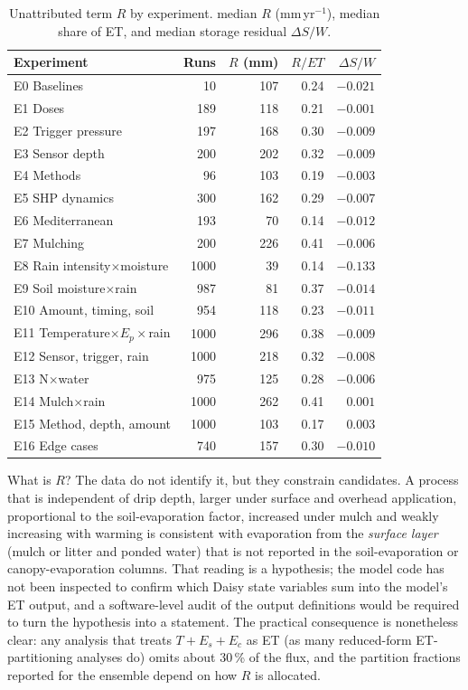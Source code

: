 \documentclass[preprint,12pt,authoryear]{elsarticle}
\begin{document}
\begin{table}[H]\centering\small
\caption{Unattributed term $R$ by experiment. median $R$ (mm\,yr$^{-1}$), median share of ET, and median storage residual $\Delta S/W$.}
\label{tab:R}
\begin{tabular}{lrrrr}
\toprule
Experiment & Runs & $R$ (mm) & $R/\mathit{ET}$ & $\Delta S/W$\\\midrule
E0 Baselines & 10 & 107 & 0.24 & $-0.021$\\
E1 Doses & 189 & 118 & 0.21 & $-0.001$\\
E2 Trigger pressure & 197 & 168 & 0.30 & $-0.009$\\
E3 Sensor depth & 200 & 202 & 0.32 & $-0.009$\\
E4 Methods & 96 & 103 & 0.19 & $-0.003$\\
E5 SHP dynamics & 300 & 162 & 0.29 & $-0.007$\\
E6 Mediterranean & 193 & 70 & 0.14 & $-0.012$\\
E7 Mulching & 200 & 226 & 0.41 & $-0.006$\\
E8 Rain intensity$\times$moisture & 1000 & 39 & 0.14 & $-0.133$\\
E9 Soil moisture$\times$rain & 987 & 81 & 0.37 & $-0.014$\\
E10 Amount, timing, soil & 954 & 118 & 0.23 & $-0.011$\\
E11 Temperature$\times E_p\times$rain & 1000 & 296 & 0.38 & $-0.009$\\
E12 Sensor, trigger, rain & 1000 & 218 & 0.32 & $-0.008$\\
E13 N$\times$water & 975 & 125 & 0.28 & $-0.006$\\
E14 Mulch$\times$rain & 1000 & 262 & 0.41 & $0.001$\\
E15 Method, depth, amount & 1000 & 103 & 0.17 & $0.003$\\
E16 Edge cases & 740 & 157 & 0.30 & $-0.010$\\\bottomrule
\end{tabular}
\end{table}

What is $R$? The data do not identify it, but they constrain candidates. A process that is independent of drip depth, larger under surface and overhead application, proportional to the soil-evaporation factor, increased under mulch and weakly increasing with warming is consistent with evaporation from the \emph{surface layer} (mulch or litter and ponded water) that is not reported in the soil-evaporation or canopy-evaporation columns. That reading is a hypothesis; the model code has not been inspected to confirm which Daisy state variables sum into the model's ET output, and a software-level audit of the output definitions would be required to turn the hypothesis into a statement. The practical consequence is nonetheless clear: any analysis that treats $T+E_s+E_c$ as ET (as many reduced-form ET-partitioning analyses do) omits about 30\,\% of the flux, and the partition fractions reported for the ensemble depend on how $R$ is allocated.
\end{document}
